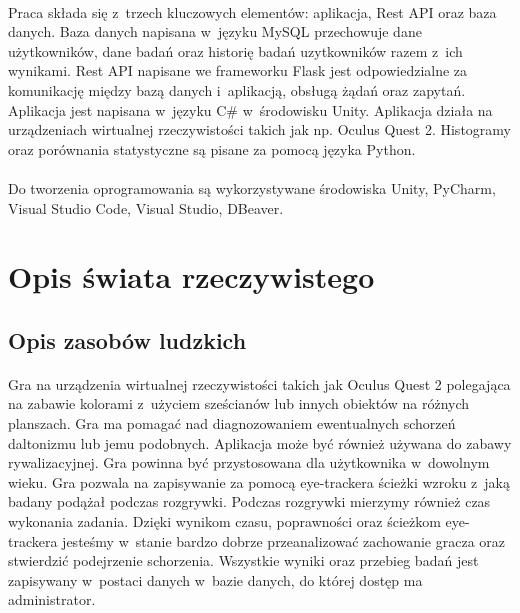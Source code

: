 \documentclass[12pt, letterpaper]{article}
\begin{document}
\paragraph{}
Praca składa się z~trzech kluczowych elementów: aplikacja, Rest API oraz baza danych. Baza danych napisana w~języku MySQL przechowuje dane użytkowników, dane badań oraz historię badań uzytkowników razem z~ich wynikami. Rest API napisane we frameworku Flask jest odpowiedzialne za komunikację między bazą danych i~aplikacją, obsługą żądań oraz zapytań. Aplikacja jest napisana w~języku C# w~środowisku Unity. Aplikacja działa na urządzeniach wirtualnej rzeczywistości takich jak np. Oculus Quest 2. Histogramy oraz porównania statystyczne są pisane za pomocą języka Python.

\paragraph{}
Do tworzenia oprogramowania są wykorzystywane środowiska Unity, PyCharm, Visual Studio Code, Visual Studio, DBeaver.

\newpage
\section{Opis świata rzeczywistego}
\subsection{Opis zasobów ludzkich}
\paragraph{}
Gra na urządzenia wirtualnej rzeczywistości takich jak Oculus Quest 2 polegająca na zabawie kolorami z~użyciem sześcianów lub innych obiektów na różnych planszach. Gra ma pomagać nad diagnozowaniem ewentualnych schorzeń daltonizmu lub jemu podobnych. Aplikacja może być również używana do zabawy rywalizacyjnej. Gra powinna być przystosowana dla użytkownika w~dowolnym wieku. Gra pozwala na zapisywanie za pomocą eye-trackera ścieżki wzroku z~jaką badany podążał podczas rozgrywki. Podczas rozgrywki mierzymy również czas wykonania zadania. Dzięki wynikom czasu, poprawności oraz ścieżkom eye-trackera jesteśmy w~stanie bardzo dobrze przeanalizować zachowanie gracza oraz stwierdzić podejrzenie schorzenia. Wszystkie wyniki oraz przebieg badań jest zapisywany w~postaci danych w~bazie danych, do której dostęp ma administrator.
	
\end{document}
